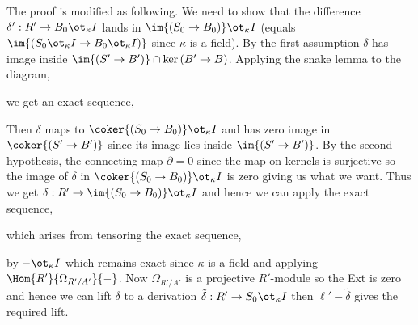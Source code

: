 \documentclass[12pt]{article}
\begin{document}
\begin{rmk}
The proof is modified as following. We need to show that the difference $\delta' : R' \to B_0 \ot_\kappa I$ lands in $\im{(S_0 \to B_0)} \ot_\kappa I$ (equals $\im{(S_0 \ot_\kappa I \to B_0 \ot_\kappa I)}$ since $\kappa$ is a field). By the first assumption $\delta$ has image inside $\im{(S' \to B')} \cap \ker{(B' \to B)}$. Applying the snake lemma to the diagram,
\begin{center}
\end{center}
we get an exact sequence,
\begin{center}
\end{center}
Then $\delta$ maps to $\coker{(S_0 \to B_0)} \ot_\kappa I$ and has zero image in $\coker{(S' \to B')}$ since its image lies inside $\im{(S' \to B')}$. By the second hypothesis, the connecting map $\partial = 0$ since the map on kernels is surjective so the image of $\delta$ in $\coker{(S_0 \to B_0)} \ot_\kappa I$ is zero giving us what we want. Thus we get $\delta : R' \to \im{(S_0 \to B_0)} \ot_\kappa I$ and hence we can apply the exact sequence,
\begin{center}
\end{center}
which arises from tensoring the exact sequence,
\begin{center}
\end{center}
by $- \ot_\kappa I$ which remains exact since $\kappa$ is a field and applying $\Hom{R'}{\Omega_{R'/A'}}{-}$. Now $\Omega_{R'/A'}$ is a projective $R'$-module so the Ext is zero and hence we can lift $\delta$ to a derivation $\tilde{\delta} : R' \to S_0 \ot_\kappa I$ then $\ell' - \tilde{\delta}$ gives the required lift.
\end{rmk}
\end{document}
